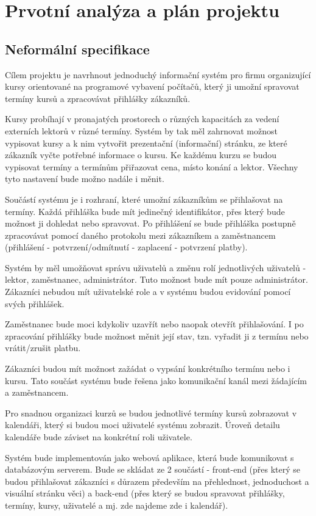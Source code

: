 \documentclass[12pt,a4paper,titlepage,final]{report}
\begin{document}
	\chapter{Prvotní analýza a plán projektu}
	
	\section{Neformální specifikace}
	Cílem projektu je navrhnout jednoduchý informační systém pro firmu organizující kursy orientované na programové vybavení počítačů, který ji umožní spravovat termíny kursů a zpracovávat přihlášky zákazníků.
	
	Kursy probíhají v pronajatých prostorech o různých kapacitách za vedení externích lektorů v různé termíny. Systém by tak měl zahrnovat možnost vypisovat kursy a k nim vytvořit prezentační (informační) stránku, ze které zákazník vyčte potřebné informace o kursu. Ke každému kurzu se budou vypisovat termíny a termínům přiřazovat cena, místo konání a lektor. Všechny tyto nastavení bude možno nadále i měnit.
	
	Součástí systému je i rozhraní, které umožní zákazníkům se přihlašovat na termíny. Každá přihláška bude mít jedinečný identifikátor, přes který bude možnost ji dohledat nebo spravovat. Po přihlášení se bude přihláška postupně zpracovávat pomocí daného protokolu mezi zákazníkem a zaměstnancem (přihlášení - potvrzení/odmítnutí - zaplacení - potvrzení platby).
	
	Systém by měl umožňovat správu uživatelů a změnu rolí jednotlivých uživatelů - lektor, zaměstnanec, administrátor. Tuto možnost bude mít pouze administrátor. Zákazníci nebudou mít uživatelské role a v systému budou evidování pomocí svých přihlášek.
	
	Zaměstnanec bude moci kdykoliv uzavřít nebo naopak otevřít přihlašování. I po zpracování přihlášky bude možnost měnit její stav, tzn. vyřadit ji z termínu nebo vrátit/zrušit platbu.
	
	Zákazníci budou mít možnost zažádat o vypsání konkrétního termínu nebo i kursu. Tato součást systému bude řešena jako komunikační kanál mezi žádajícím a zaměstnancem.
	
	Pro snadnou organizaci kurzů se budou jednotlivé termíny kursů zobrazovat v kalendáři, který si budou moci uživatelé systému zobrazit. Úroveň detailu kalendáře bude záviset na konkrétní roli uživatele.
	
	Systém bude implementován jako webová aplikace, která bude komunikovat s databázovým serverem. Bude se skládat ze 2 součástí - front-end (přes který se budou přihlašovat zákazníci s důrazem především na přehlednost, jednoduchost a visuální stránku věci)
a back-end (přes který se budou spravovat přihlášky, termíny, kursy, uživatelé a mj. zde najdeme zde i kalendář).
\end{document}
